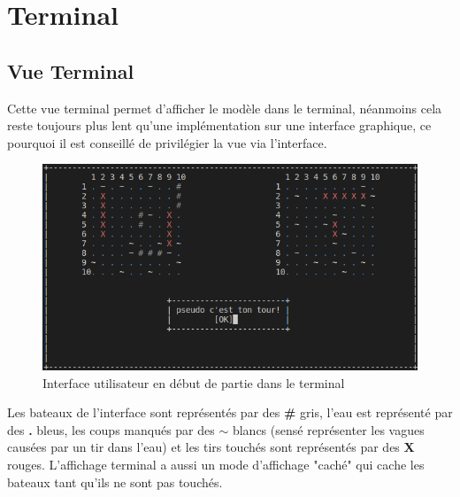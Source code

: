 \section{Terminal}
\subsection{Vue Terminal}
\par Cette vue terminal permet d'afficher le modèle dans le terminal, néanmoins cela reste toujours plus lent qu'une implémentation sur une interface graphique, ce pourquoi il est conseillé de privilégier la vue via l'interface.
\begin{figure}[H]
        \center
        \includegraphics[scale=0.5]{images/terminal/PartieEnCours.png}
        \caption{Interface utilisateur en début de partie dans le terminal}
\end{figure}

\par Les bateaux de l'interface sont représentés par des \textbf{\#} gris, l'eau est représenté par des \textbf{.} bleus, les coups manqués par des \textbf{$\sim$} blancs (sensé représenter les vagues causées par un tir dans l'eau) et les tirs touchés sont représentés par des \textbf{X} rouges. L'affichage terminal a aussi un mode d'affichage "caché" qui cache les bateaux tant qu'ils ne sont pas touchés.


